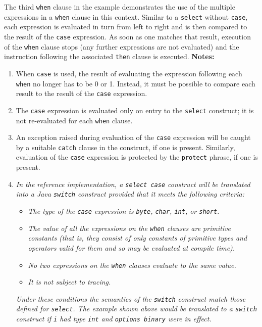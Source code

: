 The third \texttt{when} clause in the example demonstrates the use of the
multiple expressions in a \texttt{when} clause in this context.
Similar to a \texttt{select} without \texttt{case}, each
expression is evaluated in turn from left to right and is then
compared to the result of the \texttt{case} expression.
As soon as one matches that result, execution of the
\texttt{when} clause stops (any further expressions are not
evaluated) and the instruction following the associated
\texttt{then} clause is executed.
 \textbf{Notes:}
\begin{enumerate}
\item When \texttt{case} is used, the result of evaluating the expression
following each \texttt{when} no longer has to be 0 or 1.  Instead, it
must be possible to compare each result to the result of the
\texttt{case} expression.
\item 
The \texttt{case} expression is evaluated only on entry to the
\texttt{select} construct; it is not re-evaluated for each \texttt{when}
clause.
\item 
An exception raised during evaluation of the \texttt{case} expression
will be caught by a suitable \texttt{catch} clause in the construct, if
one is present.
Similarly, evaluation of the \texttt{case} expression is protected by
the \texttt{protect} phrase, if one is present.
\item 
\emph{In the reference implementation, a \texttt{select case} construct will
be translated into a Java \texttt{switch} construct provided that it
meets the following criteria:}
\begin{itemize}
\item 
\emph{The type of the \texttt{case} expression
is \texttt{byte}, \texttt{char}, \texttt{int}, or \texttt{short}.}
\item 
\emph{The value of all the expressions on the \texttt{when} clauses are
primitive constants (that is, they consist of only constants of
primitive types and operators valid for them and so may be evaluated at
compile time).}
\item 
\emph{No two expressions on the \texttt{when} clauses evaluate to the same
value.}
\item 
\emph{It is not subject to tracing.}
\end{itemize}
\emph{Under these conditions the semantics of the \texttt{switch} construct
match those defined for \texttt{select}.  The example shown above would
be translated to a \texttt{switch} construct if \texttt{i} had type \texttt{int}
and \texttt{options binary} were in effect.}
\end{enumerate}
